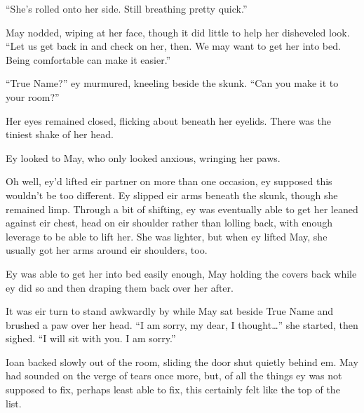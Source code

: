 ``She's rolled onto her side. Still breathing pretty quick.''

May nodded, wiping at her face, though it did little to help her disheveled look. ``Let us get back in and check on her, then. We may want to get her into bed. Being comfortable can make it easier.''

``True Name?'' ey murmured, kneeling beside the skunk. ``Can you make it to your room?''

Her eyes remained closed, flicking about beneath her eyelids. There was the tiniest shake of her head.

Ey looked to May, who only looked anxious, wringing her paws.

Oh well, ey'd lifted eir partner on more than one occasion, ey supposed this wouldn't be too different. Ey slipped eir arms beneath the skunk, though she remained limp. Through a bit of shifting, ey was eventually able to get her leaned against eir chest, head on eir shoulder rather than lolling back, with enough leverage to be able to lift her. She was lighter, but when ey lifted May, she usually got her arms around eir shoulders, too.

Ey was able to get her into bed easily enough, May holding the covers back while ey did so and then draping them back over her after.

It was eir turn to stand awkwardly by while May sat beside True Name and brushed a paw over her head. ``I am sorry, my dear, I thought\ldots{}'' she started, then sighed. ``I will sit with you. I am sorry.''

Ioan backed slowly out of the room, sliding the door shut quietly behind em. May had sounded on the verge of tears once more, but, of all the things ey was not supposed to fix, perhaps least able to fix, this certainly felt like the top of the list.
